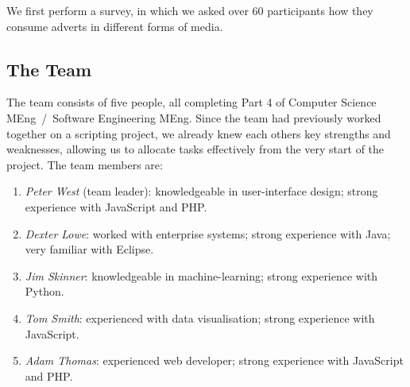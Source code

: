 We first perform a survey, in which we asked over 60 participants how they consume adverts in different forms of media.

\subsection{The Team}

The team consists of five people, all completing Part 4 of Computer Science MEng~/~Software Engineering MEng. Since the team had previously worked together on a scripting project, we already knew each others key strengths and weaknesses, allowing us to allocate tasks effectively from the very start of the project. The team members are:
\begin{enumerate}
\item \textit{Peter West} (team leader): knowledgeable in user-interface design; strong experience with JavaScript and PHP.
\item \textit{Dexter Lowe}: worked with enterprise systems; strong experience with Java; very familiar with Eclipse.
\item \textit{Jim Skinner}: knowledgeable in machine-learning; strong experience with Python.
\item \textit{Tom Smith}: experienced with data visualisation; strong experience with JavaScript.
\item \textit{Adam Thomas}: experienced web developer; strong experience with JavaScript and PHP.
\end{enumerate}

